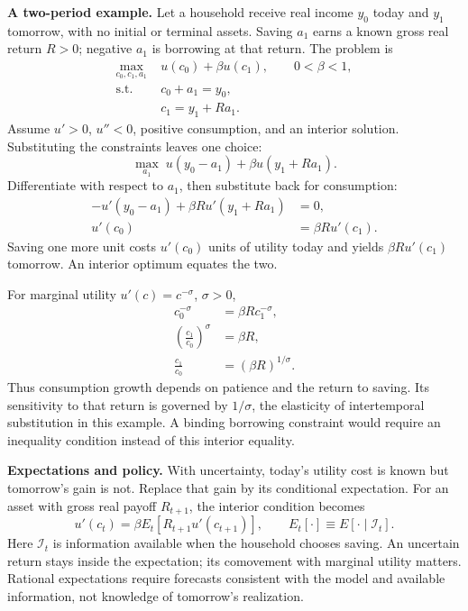 \textbf{A two-period example.}
Let a household receive real income $y_0$ today and $y_1$ tomorrow, with no
initial or terminal assets. Saving $a_1$ earns a known gross real return $R>0$;
negative $a_1$ is borrowing at that return. The problem is
\begin{equation}\label{eq:intro-household}
\begin{split}
\max_{c_0,c_1,a_1}\;&u(c_0)+\beta u(c_1),\qquad 0<\beta<1,\\
\text{s.t. }&c_0+a_1=y_0,\\
&c_1=y_1+Ra_1.
\end{split}
\end{equation}
Assume $u'>0$, $u''<0$, positive consumption, and an interior solution. Substituting
the constraints leaves one choice:
\begin{equation}
\max_{a_1}\;u(y_0-a_1)+\beta u(y_1+Ra_1).
\end{equation}
Differentiate with respect to $a_1$, then substitute back for consumption:
\begin{align}
-u'(y_0-a_1)+\beta R u'(y_1+Ra_1)&=0,\\
u'(c_0)&=\beta R u'(c_1).\label{eq:intro-euler-certain}
\end{align}
Saving one more unit costs $u'(c_0)$ units of utility today and yields
$\beta R u'(c_1)$ tomorrow. An interior optimum equates the two.

For marginal utility $u'(c)=c^{-\sigma}$, $\sigma>0$,
\begin{align}
c_0^{-\sigma}&=\beta R c_1^{-\sigma},\\
\left(\frac{c_1}{c_0}\right)^\sigma&=\beta R,\\
\frac{c_1}{c_0}&=(\beta R)^{1/\sigma}.
\end{align}
Thus consumption growth depends on patience and the return to saving. Its
sensitivity to that return is governed by $1/\sigma$, the elasticity of
intertemporal substitution in this example. A binding borrowing constraint
would require an inequality condition instead of this interior equality.

\textbf{Expectations and policy.}
With uncertainty, today's utility cost is known but tomorrow's gain is not.
Replace that gain by its conditional expectation. For an asset with gross real
payoff $R_{t+1}$, the interior condition becomes
\begin{equation}\label{eq:intro-euler-uncertain}
u'(c_t)=\beta E_t\!\left[R_{t+1}u'(c_{t+1})\right],
\qquad E_t[\cdot]\equiv E[\cdot\mid\mathcal I_t].
\end{equation}
Here $\mathcal I_t$ is information available when the household chooses saving.
An uncertain return stays inside the expectation; its comovement with marginal
utility matters. Rational expectations require forecasts consistent with the
model and available information, not knowledge of tomorrow's realization.


